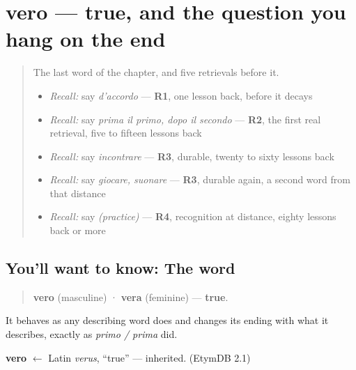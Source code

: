 \section[vero?]{vero — true, and the question you hang on the end}

\label{lesson:IT-C29-vero}



\begin{quote}
The last word of the chapter, and five retrievals before it.

\begin{itemize}
\raggedright
  \item \emph{Recall:} say \emph{d'accordo} — \textbf{R1}, one lesson back, before it decays
  \item \emph{Recall:} say \emph{prima il primo, dopo il secondo} — \textbf{R2}, the first real retrieval, five to fifteen lessons back
  \item \emph{Recall:} say \emph{incontrare} — \textbf{R3}, durable, twenty to sixty lessons back
  \item \emph{Recall:} say \emph{giocare, suonare} — \textbf{R3}, durable again, a second word from that distance
  \item \emph{Recall:} say \emph{(practice)} — \textbf{R4}, recognition at distance, eighty lessons back or more
\end{itemize}
\end{quote}

\subsection*{You'll want to know: The word}
\begin{quote}
\textbf{vero} (masculine) · \textbf{vera} (feminine) — \textbf{true}.
\end{quote}

It behaves as any describing word does and changes its ending with what it describes, exactly as \emph{primo / prima} did.

\begin{cousinweb}
\textbf{vero} $\leftarrow$ Latin \emph{verus}, \textquotedblleft{}true\textquotedblright{} — inherited. (EtymDB 2.1)
\end{cousinweb}

